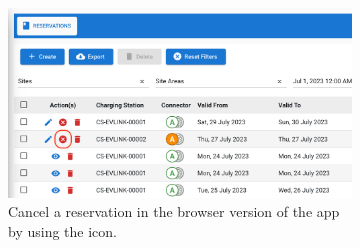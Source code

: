 \begin{figure}[h]
    \centering
    \begin{subfigure}[c]{0.6\textwidth}
        \includegraphics[width=\textwidth]{resources/images/main/6_implementation/screens/cancel_reservation/web/Cancel_Reservation.png}
        \captionsetup{skip=43pt}
        \caption{Cancel a reservation in the browser version of the app by using the  icon.}
        \label{fig:web-cancel-reservation-impl}
    \end{subfigure}
    \hfill
    \begin{subfigure}[c]{0.3\textwidth}

\end{subfigure}
\end{figure}
